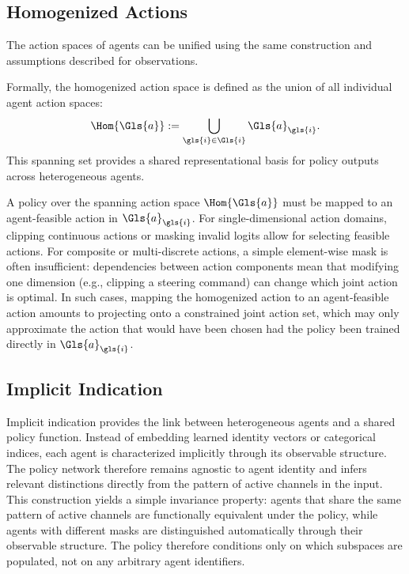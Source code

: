 \subsection{Homogenized Actions}

The action spaces of agents can be unified using the same 
construction and assumptions described for observations. 

Formally, the homogenized action space is defined as the union 
of all individual agent action spaces:
\[
    \Hom{\Gls{a}} := \bigcup_{\gls{i} \in \Gls{i}} \Gls{a}_{\gls{i}}.
\]
This spanning set provides a shared representational basis for 
policy outputs across heterogeneous agents.

A policy over the spanning action space \(\Hom{\Gls{a}}\) 
must be mapped to an agent-feasible action in \(\Gls{a}_{\gls{i}}\).
For single-dimensional action domains, clipping continuous actions
or masking invalid logits allow for selecting feasible actions.
% 
For composite or multi-discrete actions, a simple element-wise 
mask is often insufficient: dependencies between action components 
mean that modifying one dimension (e.g., clipping a steering command) 
can change which joint action is optimal. 
In such cases, mapping the homogenized action to an agent-feasible 
action amounts to projecting onto a constrained joint action set, 
which may only approximate the action that would have been 
chosen had the policy been trained directly in \(\Gls{a}_{\gls{i}}\).

\subsection{Implicit Indication}

Implicit indication provides the link between 
heterogeneous agents and a shared policy function.
Instead of embedding learned identity vectors or categorical indices, 
each agent is characterized implicitly through its observable structure.
The policy network therefore remains agnostic to agent identity and infers 
relevant distinctions directly from the pattern of active channels in the input.
% 
This construction yields a simple invariance property: agents that share the 
same pattern of active channels are functionally equivalent under the policy, 
while agents with different masks are distinguished automatically through 
their observable structure. The policy therefore conditions only on which 
subspaces are populated, not on any arbitrary agent identifiers.

